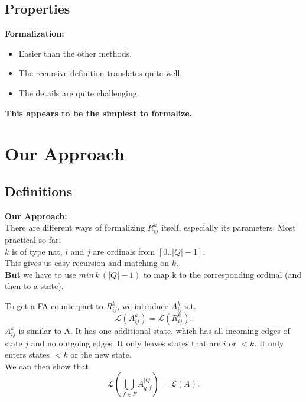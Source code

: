 \documentclass{beamer}
\begin{document}
\subsection*{Properties}
\begin{frame}
    \textbf{Formalization:} \\
    \begin{itemize}
        \item
            Easier than the other methods.\\
        \item
            The recursive definition translates quite well.\\
        \item
            The details are quite challenging.
    \end{itemize} 

    \pause

    {\centering 
        \textbf{This appears to be the simplest to formalize.}

    }
\end{frame}

\section{Our Approach}
\subsection*{Definitions}
\begin{frame}
    \textbf{Our Approach:} \\

    There are different ways of formalizing $R^k_{i j}$ itself, especially its parameters. Most practical so far: \\
    $k$ is of type nat, $i$ and $j$ are ordinals from $[0..|Q|-1]$.\\
    \pause
    This gives us easy recursion and matching on $k$.\\
    \pause
    \textbf{But} we have to use $min \, k \, (|Q|-1)$ to map k to the corresponding ordinal (and then to a state).

\end{frame}

\begin{frame}
    To get a FA counterpart to $R^k_{i j}$, we introduce $A^k_{i j}$ s.t.
    \begin{equation*}
        \mathcal{L}(A^k_{i j}) = \mathcal{L}(R^k_{i j}).
    \end{equation*}
    $A^k_{i j}$ is similar to A. It has one additional state, which has all incoming edges of state $j$ and no outgoing edges. It only leaves states that are $i$ or  $<k$. It only enters states $<k$ or the new state.
    \\
    We can then show that  
    \begin{equation*}
        \mathcal{L}(\bigcup_{f \in F} A^{|Q|}_{q_0 f}) = \mathcal{L}(A).
    \end{equation*}
\end{frame}
\end{document}

